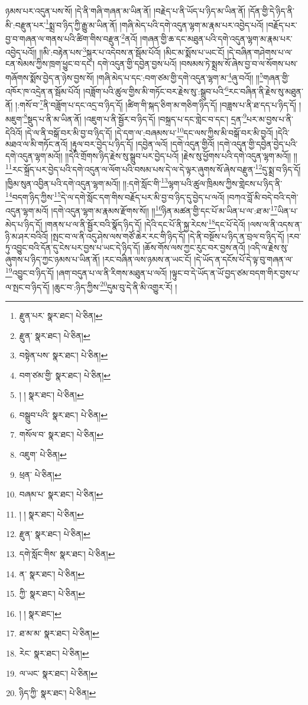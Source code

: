 ཉམས་པར་འདུན་པས་སོ། །དེ་ནི་གཞི་གཞན་མ་ཡིན་ནོ། །བརྗེད་པ་ནི་ཡོད་པ་ཉིད་མ་ཡིན་ནོ། །དོན་གྱི་དེ་ཉིད་ནི་མི་:བརྫུན་པར་\footnote{རྫུན་པར་  སྣར་ཐང་།  པེ་ཅིན། }སྨྲ་བ་ཉིད་ཀྱི་རྒྱུ་མ་ཡིན་ནོ། །གཞི་མེད་པའི་དགེ་འདུན་ལྷག་མ་རྣམ་པར་འབྱེད་པའོ། །བརྗོད་པར་བྱ་བ་གཞན་ལ་གནས་པའི་ཚིག་གིས་བརྫུན་\footnote{རྫུན་  སྣར་ཐང་།  པེ་ཅིན། }ནའོ། །གཞན་གྱི་ཆ་དང་མཐུན་པའི་དགེ་འདུན་ལྷག་མ་རྣམ་པར་འབྱེད་པའོ།། །།མི་:བརྟེན་པས་\footnote{བསྟེན་པས་  སྣར་ཐང་།  པེ་ཅིན། }སྐུར་པ་འདེབས་ན་སྦོམ་པོའོ། །མིང་མ་སྨོས་པ་ཡང་ངོ། །དེ་བཞིན་གཤེགས་པ་ལ་ངན་སེམས་ཀྱིས་ཁྲག་ཕྱུང་བ་དང་། དགེ་འདུན་གྱི་དབྱེན་བྱས་པའོ། །བསམས་ཏེ་སྨྲས་སོ་ཞེས་བྱ་བ་ལ་སོགས་པས་གཞོགས་སྨོས་བྱེད་ན་ཉེས་བྱས་སོ། །གཞི་མེད་པ་དང་:བག་ཙམ་གྱི་དགེ་འདུན་ལྷག་མ་\footnote{བག་ཙམ་གྱི་  སྣར་ཐང་།  པེ་ཅིན། }ཞུ་བའོ།། །།\footnote{། །  སྣར་ཐང་།  པེ་ཅིན། }གཞན་གྱི་འཁོར་ཁ་འདྲེན་ན་སྦོམ་པོའོ། །བཟློག་པའི་ཚུལ་གྱིས་མི་གཏོང་བར་རྗེས་སུ་:སྒྲུབ་པའི་\footnote{བསྒྲུབ་པའི་  སྣར་ཐང་།  པེ་ཅིན། }རང་བཞིན་ནི་རྗེས་སུ་མཐུན་ནོ། །:གསོ་བ་\footnote{གསོལ་བ་  སྣར་ཐང་།  པེ་ཅིན། }ནི་བཟློག་པ་དང་འདྲ་བ་ཉིད་དོ། །ཚིག་གི་སྐད་ཅིག་མ་གཅིག་ཉིད་དོ། །བཟླས་པ་ནི་ཐ་དད་པ་ཉིད་དོ། །མཇུག་\footnote{འཇུག་  པེ་ཅིན། }སྡུད་པ་ནི་མ་ཡིན་ནོ། །འཇུག་པ་ནི་སྦྱོར་བ་ཉིད་དོ། །བསྐྲད་པ་དང་གླེང་བ་དང་། དྲན་\footnote{ཕྲན་  པེ་ཅིན། }པར་མ་བྱས་པ་ནི་དེའིའོ། །དེ་ལ་ནི་བསྒོ་བར་མི་བྱ་བ་ཉིད་དོ། །དེ་དག་ལ་:བཞམས་པ་\footnote{བཞམ་པ་  སྣར་ཐང་།  པེ་ཅིན། }དང་ལས་ཀྱིས་མི་བསྒོ་བར་མི་བྱའོ། །དེའི་མཐའ་ལ་མི་གཏོང་ནའོ། །རྟུལ་བར་བྱེད་པ་ཉིད་དོ། །དབྱེན་ལའོ། །དགེ་འདུན་གྱིའོ། །དགེ་འདུན་གྱི་དབྱེན་བྱེད་པའི་དགེ་འདུན་ལྷག་མའོ།། །།དེའི་གྲོགས་ཉིད་རྗེས་སུ་སྒྲུབ་པར་བྱེད་པའོ། །རྗེས་སུ་ཕྱོགས་པའི་དགེ་འདུན་ལྷག་མའོ།། །།\footnote{། །  སྣར་ཐང་།  པེ་ཅིན། }རང་སྐྲོད་པར་བྱེད་པའི་དགེ་འདུན་ལ་ལོག་པའི་བསམ་པས་དེ་ལ་དེ་ལྟར་ཞུགས་སོ་ཞེས་བརྫུན་\footnote{རྫུན་  སྣར་ཐང་།  པེ་ཅིན། }དུ་སྨྲ་བ་ཉིད་དོ། །ཁྱིམ་སུན་འབྱིན་པའི་དགེ་འདུན་ལྷག་མའོ།། །།:དགེ་སློང་གི་\footnote{དགེ་སློང་གིས་  སྣར་ཐང་།  པེ་ཅིན། }ལྷག་པའི་ཚུལ་ཁྲིམས་ཀྱིས་གླེངས་པ་ཉིད་ནི་\footnote{ན་  སྣར་ཐང་།  པེ་ཅིན། }བདག་ཉིད་ཀྱིས་\footnote{ཀྱི་  སྣར་ཐང་།  པེ་ཅིན། }དེ་ལ་དགེ་སློང་དག་གིས་བརྗོད་པར་མི་བྱ་བ་ཉིད་དུ་བྱེད་པ་ལའོ། །བཀའ་བློ་མི་བདེ་བའི་དགེ་འདུན་ལྷག་མའོ། །དགེ་འདུན་ལྷག་མ་རྣམས་རྫོགས་སོ།། །།\footnote{། །  སྣར་ཐང་། }ཉིན་མཚན་གྱི་དང་པོ་མ་ཡིན་པ་ལ་:ཐ་མ་\footnote{ཐ་མ་མ་  སྣར་ཐང་།  པེ་ཅིན། }ཡིན་པ་མེད་པ་ཉིད་དོ། །གནས་པ་ལ་ནི་སྦྱོར་བའི་སྣོད་ཉིད་དོ། །དེའི་དང་པོ་ནི་སྐྱ་རེངས་\footnote{རེང་  སྣར་ཐང་།  པེ་ཅིན། }དང་པོ་དེའོ། །ལས་ལ་ནི་འདས་ན་ཉི་མ་ཤར་བའིའོ། །སྤང་བ་ལ་ནི་འདུ་ཤེས་ལས་གཙོ་ཆེར་རང་གི་ཉིད་དོ། །དེ་ནི་བསྔོས་པ་ཉིད་ན་བྲལ་བ་ཉིད་དོ། །རབ་ཏུ་འབྱུང་བའི་དོན་དུ་ངེས་པར་བྱས་པ་ཡང་དེ་ཉིད་དོ། །ཆོས་གོས་ལས་ཀྱང་རུང་བར་བྱས་ནའོ། །འདི་ལ་རྗེས་སུ་ཞུགས་པ་ཉིད་ཀྱང་ཉམས་པ་ཡིན་ནོ། །རང་བཞིན་ལས་ཉམས་ན་ཡང་ངོ། །དེ་ཡོད་ན་དངོས་པོ་དེ་ལྟ་བུ་གཞན་ལ་\footnote{ལ་ཡང་  སྣར་ཐང་།  པེ་ཅིན། }འབྱུང་བ་ཉིད་དོ། །ཞག་བདུན་པ་ལ་ནི་རིགས་མཐུན་པ་ལའོ། །ལྟུང་བ་དེ་ཡོད་ན་ཡོ་བྱད་ཙམ་བདག་གིར་བྱས་པ་ལ་སྤང་བ་ཉིད་དོ། །ཆུང་བ་:ཉིད་ཀྱིས་\footnote{ཉིད་ཀྱི་  སྣར་ཐང་།  པེ་ཅིན། }དུམ་བུ་དེ་ནི་མི་འགྱུར་རོ། །

